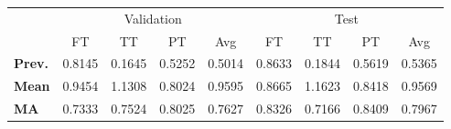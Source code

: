 \begin{tabular}{lcccccccc}
\toprule
{} & \multicolumn{4}{c}{Validation} & \multicolumn{4}{c}{Test} \\
{} &         FT &      TT &      PT &     Avg &      FT &      TT &      PT &     Avg \\
\midrule
\textbf{Prev.} &     0.8145 &  0.1645 &  0.5252 &  0.5014 &  0.8633 &  0.1844 &  0.5619 &  0.5365 \\
\textbf{Mean } &     0.9454 &  1.1308 &  0.8024 &  0.9595 &  0.8665 &  1.1623 &  0.8418 &  0.9569 \\
\textbf{MA   } &     0.7333 &  0.7524 &  0.8025 &  0.7627 &  0.8326 &  0.7166 &  0.8409 &  0.7967 \\
\bottomrule
\end{tabular}
